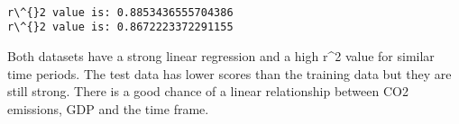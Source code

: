 \documentclass[11pt]{article}
\begin{document}
    \begin{center}
    \end{center}
    { \hspace*{\fill} \\}
    
    \begin{Verbatim}[commandchars=\\\{\}]
r\^{}2 value is: 0.8853436555704386
r\^{}2 value is: 0.8672223372291155

    \end{Verbatim}

    Both datasets have a strong linear regression and a high r\^{}2 value
for similar time periods. The test data has lower scores than the
training data but they are still strong. There is a good chance of a
linear relationship between CO2 emissions, GDP and the time frame.
\end{document}
